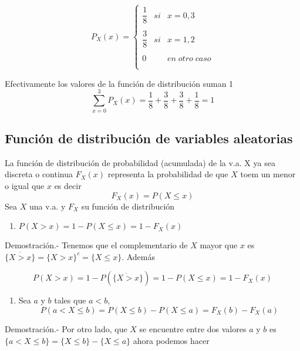 \documentclass[
]{article}
\providecommand{\tightlist}{%
  \setlength{\itemsep}{0pt}\setlength{\parskip}{0pt}}
\begin{document}
\[P_X(x) = \left\{ \begin{array}{rcl} 
  \dfrac{1}{8} & si & x=0,3\\\\ 
  \dfrac{3}{8}& si & x=1,2\\\\
  0&&en\; otro \; caso\\\\
\end{array}\right.\]

Efectivamente los valores de la función de distribución suman 1
\[\sum_{x=0}^{3} P_X(x) = \dfrac{1}{8} + \dfrac{3}{8} + \dfrac{3}{8} + \dfrac{1}{8} = 1\]

\hypertarget{funciuxf3n-de-distribuciuxf3n-de-variables-aleatorias}{%
\subsection{Función de distribución de variables
aleatorias}\label{funciuxf3n-de-distribuciuxf3n-de-variables-aleatorias}}

La función de distribución de probabilidad (acumulada) de la v.a. X ya
sea discreta o continua \(F_X(x)\) representa la probabilidad de que
\(X\) toem un menor o igual que \(x\) es decir \[F_X(x) = P(X\leq x)\]
Sea \(X\) una v.a. y \(F_X\) su función de distribución

\begin{enumerate}
\def\labelenumi{\arabic{enumi}.}
\tightlist
\item
  \(P(X>x) = 1-P(X\leq x) = 1 - F_X(x)\)
\end{enumerate}

Demostración.- Tenemos que el complementario de \(X\) mayor que \(x\) es
\(\overline{\lbrace X>x\rbrace} = \lbrace X>x\rbrace^c = \lbrace X\leq x\rbrace\).
Además

\[P(X>x) = 1 -P\left(\overline{\lbrace X > x}\rbrace\right) = 1 - P(X\leq x) = 1 - F_X(x)\]

\begin{enumerate}
\def\labelenumi{\arabic{enumi}.}
\setcounter{enumi}{1}
\tightlist
\item
  Sea \(a\) y \(b\) tales que \(a<b\),
  \[P(a<X\leq b) = P(X\leq b) - P(X\leq a) = F_X(b) - F_X(a)\]
\end{enumerate}

Demostración.- Por otro lado, que \(X\) se encuentre entre dos valores
\(a\) y \(b\) es
\(\lbrace a<X\leq b \rbrace = \lbrace X\leq b \rbrace - \lbrace X\leq a \rbrace\)
ahora podemos hacer
\end{document}
